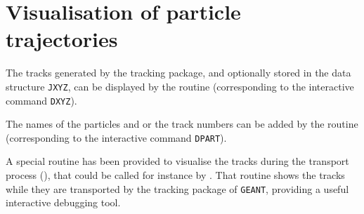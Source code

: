              
\section{Visualisation of particle trajectories}
The tracks generated by the tracking package, and optionally stored
in the data structure {\tt JXYZ}, can be displayed by the routine 
(corresponding to the interactive command {\tt DXYZ}).
 
The names of the particles and or the track numbers can be added
by the routine  (corresponding to the interactive command 
{\tt DPART}).
 
A special routine has been provided to visualise the tracks during the
transport process
(), that could be called for instance by .
That routine shows the tracks while they are transported
by the tracking package of {\tt GEANT}, providing a useful interactive
debugging tool.

 
